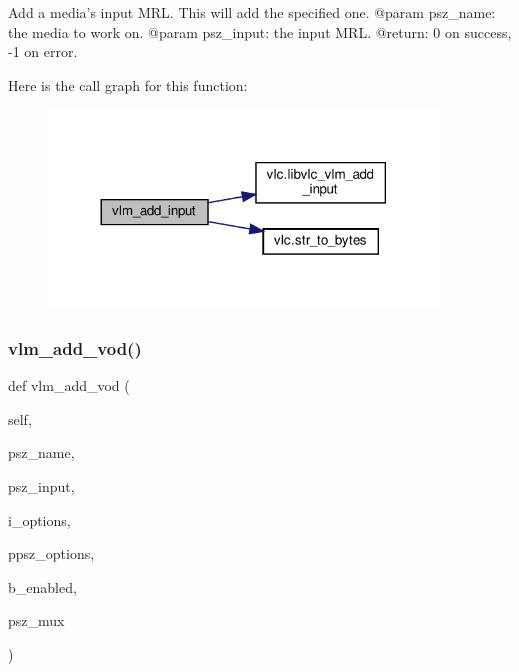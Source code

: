 \begin{DoxyVerb}Add a media's input MRL. This will add the specified one.
@param psz_name: the media to work on.
@param psz_input: the input MRL.
@return: 0 on success, -1 on error.
\end{DoxyVerb}
 Here is the call graph for this function\+:
\nopagebreak
\begin{figure}[H]
\begin{center}
\leavevmode
\includegraphics[width=293pt]{classvlc_1_1_instance_ab52ce0a6d96b77def1fd4a2e451fe2d4_cgraph}
\end{center}
\end{figure}
\mbox{\label{classvlc_1_1_instance_a4ef5661bf1bcdef3f131c1d4694c6fe3}} 
\subsubsection{\texorpdfstring{vlm\+\_\+add\+\_\+vod()}{vlm\_add\_vod()}}
{\footnotesize\ttfamily def vlm\+\_\+add\+\_\+vod (\begin{DoxyParamCaption}\item[{}]{self,  }\item[{}]{psz\+\_\+name,  }\item[{}]{psz\+\_\+input,  }\item[{}]{i\+\_\+options,  }\item[{}]{ppsz\+\_\+options,  }\item[{}]{b\+\_\+enabled,  }\item[{}]{psz\+\_\+mux }\end{DoxyParamCaption})}

